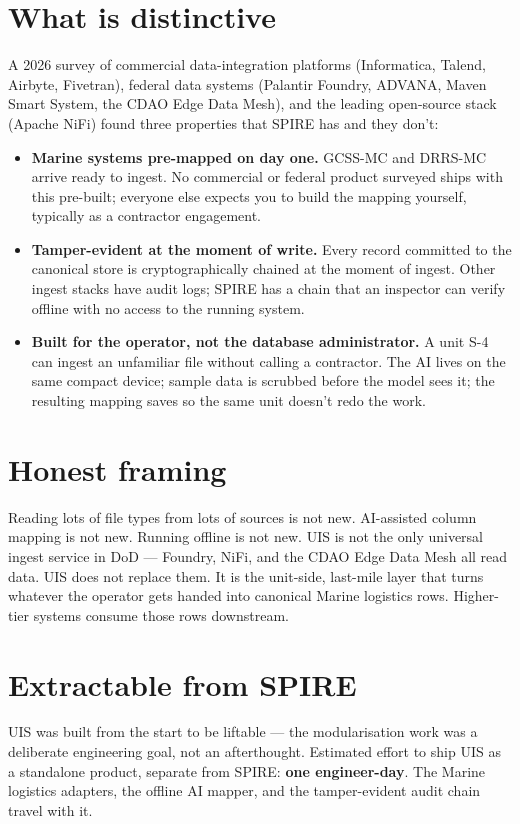 \documentclass[10pt]{extarticle}
\begin{document}
\section*{What is distinctive}
A 2026 survey of commercial data-integration platforms (Informatica,
Talend, Airbyte, Fivetran), federal data systems (Palantir Foundry,
ADVANA, Maven Smart System, the CDAO Edge Data Mesh), and the leading
open-source stack (Apache NiFi) found three properties that SPIRE has
and they don't:
\begin{itemize}
  \item \textbf{Marine systems pre-mapped on day one.} GCSS-MC and
    DRRS-MC arrive ready to ingest. No commercial or federal product
    surveyed ships with this pre-built; everyone else expects you to
    build the mapping yourself, typically as a contractor engagement.
  \item \textbf{Tamper-evident at the moment of write.} Every record
    committed to the canonical store is cryptographically chained at the
    moment of ingest. Other ingest stacks have audit logs; SPIRE has a
    chain that an inspector can verify offline with no access to the
    running system.
  \item \textbf{Built for the operator, not the database administrator.}
    A unit S-4 can ingest an unfamiliar file without calling a
    contractor. The AI lives on the same compact device; sample data is scrubbed
    before the model sees it; the resulting mapping saves so the same
    unit doesn't redo the work.
\end{itemize}

\section*{Honest framing}
Reading lots of file types from lots of sources is not new. AI-assisted
column mapping is not new. Running offline is not new. UIS is not the
only universal ingest service in DoD --- Foundry, NiFi, and the CDAO
Edge Data Mesh all read data. UIS does not replace them. It is the
unit-side, last-mile layer that turns whatever the operator gets handed
into canonical Marine logistics rows. Higher-tier systems consume those
rows downstream.

\section*{Extractable from SPIRE}
UIS was built from the start to be liftable --- the modularisation work
was a deliberate engineering goal, not an afterthought. Estimated effort
to ship UIS as a standalone product, separate from SPIRE: \textbf{one
engineer-day}. The Marine logistics adapters, the offline AI mapper, and
the tamper-evident audit chain travel with it.
\end{document}
